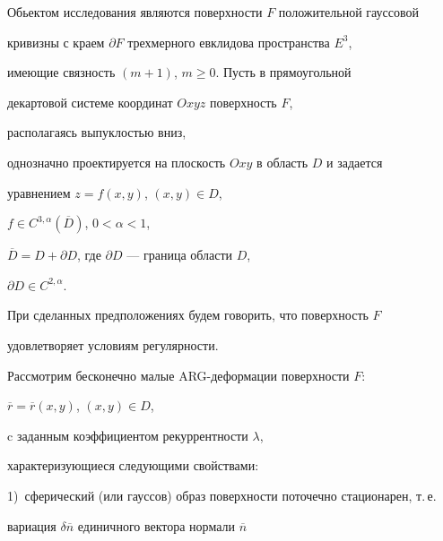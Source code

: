 \pagestyle{plain} %







\maketitle


\label{begin}











Обьектом исследования являются поверхности $F$ положительной гауссовой 


кривизны с краем $\partial F$ трехмерного евклидова пространства $E^3$, 


имеющие связность $ ({m+1})$, $m \ge 0$. Пусть в прямоугольной 


декартовой системе координат $Oxyz$ поверхность $F$,


располагаясь выпуклостью вниз, 


однозначно проектируется на плоскость $Oxy$ в область $D$ и задается 


уравнением $z=f ({x,y})$, $ ({x,y}) \in D$, 


$f \in C^{3,\alpha} ({\overline D })$, $0<\alpha<1$,


$\overline D=D+\partial D$, где $\partial D$ --- граница области $D$, 


$\partial D \in C^{2,\alpha}$.


При сделанных предположениях будем говорить, что поверхность $F$ 


удовлетворяет условиям регулярности.





Рассмотрим бесконечно малые ARG-деформации поверхности $F$: 


$\overline r=\overline r ({x,y})$, $ ({x,y}) \in D$,


c заданным коэффициентом рекуррентности $\lambda$, 


характеризующиеся следующими свойствами:





1)~сферический (или гауссов) образ поверхности поточечно стационарен, т.\,е.


вариация $\delta \overline n$ единичного вектора нормали $\overline n$ 


